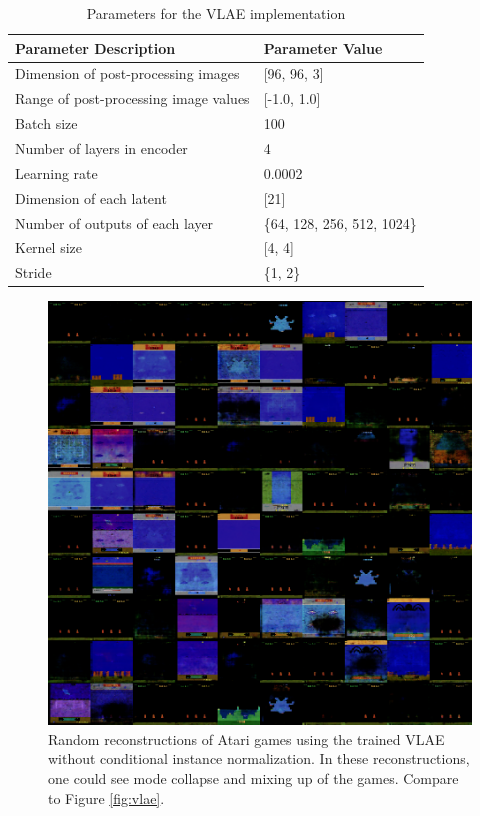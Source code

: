 \documentclass{article}
\begin{document}
\begin{table}
  \caption{Parameters for the VLAE implementation}
  \label{tab:paramVLAE}
  \centering
  \begin{tabular}{ll}
    \toprule
    Parameter Description & Parameter Value \\
    \midrule
    Dimension of post-processing images & [96, 96, 3] \\
    Range of post-processing image values & [-1.0, 1.0] \\
    Batch size & 100 \\
    Number of layers in encoder & 4 \\
    Learning rate & 0.0002 \\
    Dimension of each latent & [21] \\
    Number of outputs of each layer & \{64, 128, 256, 512, 1024\}\\
    Kernel size & [4, 4]\\
    Stride & \{1, 2\} \\
    \bottomrule
  \end{tabular}
\end{table}

\begin{figure}
  \includegraphics[width=0.8\linewidth]{withoutConditioning.png}
  \caption{Random reconstructions of Atari games using the trained VLAE without conditional instance normalization. In these reconstructions, one could see mode collapse and mixing up of the games. Compare to Figure \ref{fig:vlae}.}
  \label{fig:vlae-cond}
\end{figure}
\end{document}
